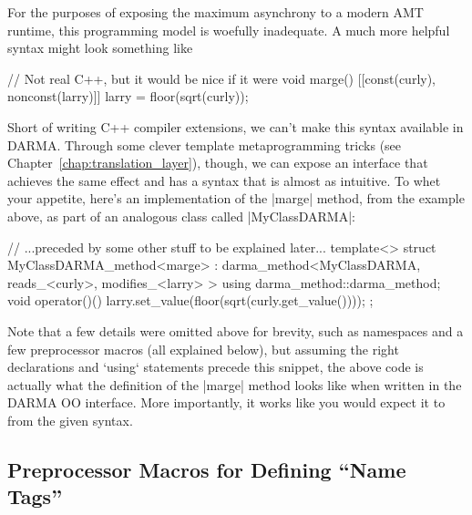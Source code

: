 For the purposes of exposing the maximum asynchrony to a modern AMT runtime,
this programming model is woefully inadequate.  A much more helpful syntax might
look something like
\begin{CppCodeNumb}
// Not real C++, but it would be nice if it were
void marge() [[const(curly), nonconst(larry)]] {
  larry = floor(sqrt(curly));
}
\end{CppCodeNumb}
Short of writing C++ compiler extensions, we can't make this syntax available in
DARMA.  Through some clever template metaprogramming tricks (see
Chapter~\ref{chap:translation_layer}), though, we can expose an interface that 
achieves the same effect and has a syntax that is almost as intuitive. To whet
your appetite, here's an implementation of the |marge| method, from the example
above, as part of an analogous class called |MyClassDARMA|:
\begin{CppCodeNumb}
// ...preceded by some other stuff to be explained later...
template<>
struct MyClassDARMA_method<marge>
  : darma_method<MyClassDARMA,
      reads_<curly>,
      modifies_<larry>
    >
{
  using darma_method::darma_method;
  void operator()() {
    larry.set_value(floor(sqrt(curly.get_value())));
  }
};
\end{CppCodeNumb}
Note that a few details were omitted above for brevity, such as namespaces and a
few preprocessor macros (all explained below), but assuming the right
declarations and `using` statements precede this snippet, the above code is
actually what the definition of the |marge| method looks like when written in
the DARMA OO interface.  More importantly, it works like you would expect it to
from the given syntax.

\subsection{Preprocessor Macros for Defining ``Name Tags''}
\label{subsec:oomacros}

